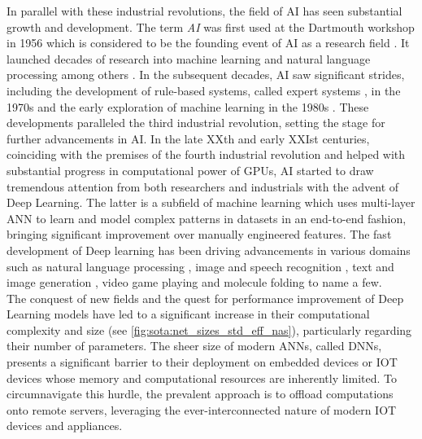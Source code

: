 In parallel with these industrial revolutions, the field of \ac{AI} has seen
substantial growth and development. The term \emph{\acl{AI}} was first used at
the Dartmouth workshop in 1956 which is considered to be the founding event of
\ac{AI} as a research field \cite{dartmouth1956}. It launched decades of
research into machine learning and natural language processing among others
\cite{nilsson1998artificial}. In the subsequent decades, \ac{AI} saw significant
strides, including the development of rule-based systems, called expert systems
\cite{giarratano1994expert}, in the 1970s and the early exploration of machine
learning in the 1980s \cite{rumelhart1986learning}. These developments
paralleled the third industrial revolution, setting the stage for further
advancements in \ac{AI}. In the late XXth and early XXIst centuries, coinciding
with the premises of the fourth industrial revolution and helped with
substantial progress in computational power of \acp{GPU}, \ac{AI} started to
draw tremendous attention from both researchers and industrials with the advent
of Deep Learning. The latter is a subfield of machine learning which uses
multi-layer \ac{ANN} to learn and model complex patterns in datasets in an
end-to-end fashion, bringing significant improvement over manually engineered
features. The fast development of Deep learning has been driving advancements in
various domains such as natural language processing
\cite{DBLP:conf/emnlp/BudzianowskiV19,DBLP:conf/naacl/DevlinCLT19,DBLP:conf/nips/VaswaniSPUJGKP17},
image and speech recognition
\cite{DBLP:conf/nips/KrizhevskySH12,DBLP:journals/corr/SimonyanZ14a,DBLP:conf/cvpr/HeZRS16,DBLP:journals/corr/HannunCCCDEPSSCN14,DBLP:conf/icassp/ChanJLV16,DBLP:conf/icml/AmodeiABCCCCCCD16},
text and image generation
\cite{goodfellow2020generative,karras2019style,DBLP:conf/emnlp/BudzianowskiV19},
video game playing \cite{silver2016mastering,silver2018general} and molecule
folding \cite{jumper2021highly} to name a few.\\


The conquest of new fields and the quest for performance improvement of Deep
Learning models have led to a significant increase in their computational
complexity and size (see \cref{fig:sota:net_sizes_std_eff_nas}), particularly
regarding their number of parameters. The sheer size of modern \acp{ANN}, called
\acp{DNN}, presents a significant barrier to their deployment on embedded
devices or \ac{IOT} devices whose memory and computational resources are
inherently limited. To circumnavigate this hurdle, the prevalent approach is to
offload computations onto remote servers, leveraging the ever-interconnected
nature of modern \ac{IOT} devices and appliances.\\

